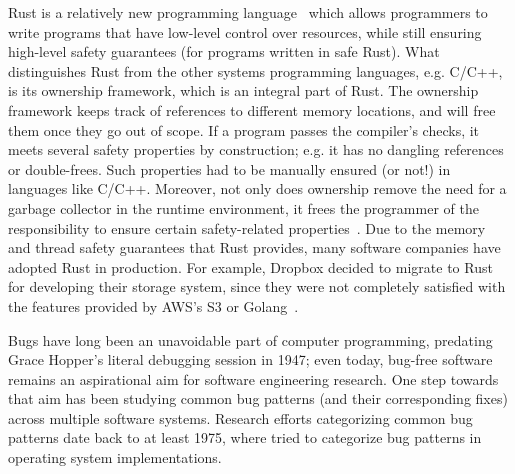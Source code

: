 Rust is a relatively new programming language~\citep{klabnik2019rust} which allows programmers to write programs that have low-level control over resources, while still ensuring high-level safety guarantees (for programs written in safe Rust). What distinguishes Rust from the other systems programming languages, e.g. C/C++, is its ownership framework, which is an integral part of Rust. The ownership framework keeps track of references to different memory locations, and will free them once they go out of scope. If a program passes the compiler’s checks, it meets several safety properties by construction; e.g. it has no dangling references or double-frees. Such properties had to be manually ensured (or not!) in languages like C/C++. Moreover, not only does ownership remove the need for a garbage collector in the runtime environment, it frees the programmer of the responsibility to ensure certain safety-related properties~\citep{qin2020understanding}. Due to the memory and thread safety guarantees that Rust provides, many software companies have adopted Rust in production. For example, Dropbox decided to migrate to Rust for developing their storage system, since they were not completely satisfied with the features provided by AWS’s S3 or Golang~\citep{dropbox}.

Bugs have long been an unavoidable part of computer programming, predating Grace Hopper's literal debugging session in 1947; even today, bug-free software remains an aspirational aim for software engineering research. One step towards that aim has been studying common bug patterns (and their corresponding fixes) across multiple software systems. Research efforts categorizing common bug patterns date back to at least 1975, where \cite{endres1975analysis} tried to categorize bug patterns in operating system implementations.  

